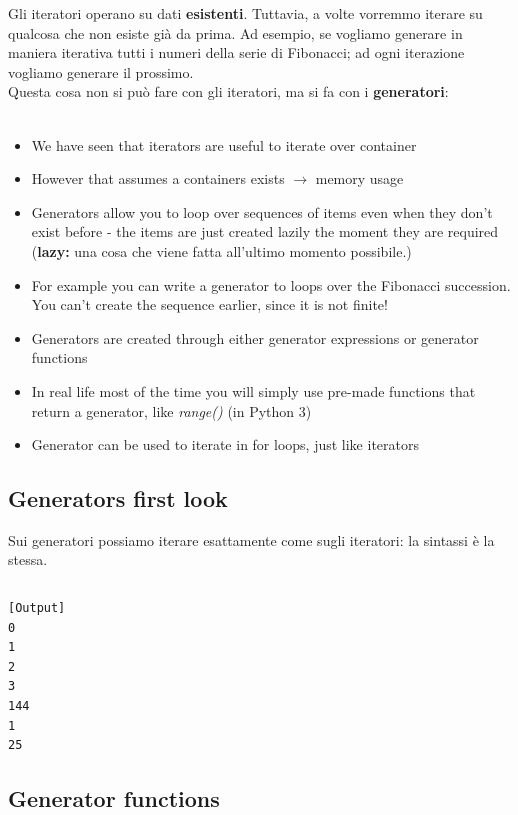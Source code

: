 Gli iteratori operano su dati \textbf{esistenti}. Tuttavia, a volte vorremmo iterare su qualcosa che non esiste già da prima. Ad esempio, se vogliamo generare in maniera iterativa tutti i numeri della serie di Fibonacci; ad ogni iterazione vogliamo generare il prossimo.\\
Questa cosa non si può fare con gli iteratori, ma si fa con i \textbf{generatori}:\\\

  \begin{itemize}
    \item We have seen that iterators are useful to iterate over container
    \item However that assumes a containers exists $\rightarrow$ memory usage
    \item \alert{Generators} allow you to loop over sequences of items even when
          they don't exist before - the items are just created \alert{lazily} the
          moment they are required (\textbf{lazy:} una cosa che viene fatta all'ultimo momento possibile.)
    \item For example you can write a generator to loops over the Fibonacci
          succession. You can't create the sequence earlier, since it is not
          finite!
    \item Generators are created through either \alert{generator expressions} or
          \alert{generator functions}
    \item In real life most of the time you will simply use pre-made functions
          that return a generator, like \emph{range()} (in Python 3)
    \item Generator can be used to iterate in for loops, just like iterators
  \end{itemize}


\subsection{Generators first look}

Sui generatori possiamo iterare esattamente come sugli iteratori: la sintassi è la stessa.\\

\inputminted{python}{snippets/generators.py}

\begin{verbatim}
[Output]
0
1
2
3
144
1
25
\end{verbatim}


\subsection{Generator functions}

